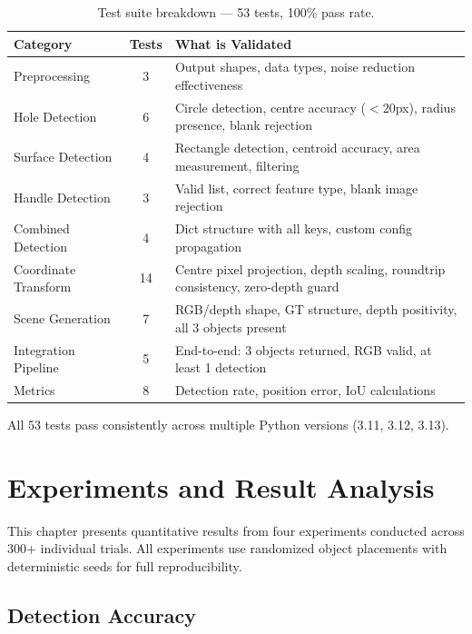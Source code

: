 \documentclass[11pt,a4paper]{article}
\begin{document}
\begin{table}[H]
\centering
\caption{Test suite breakdown --- 53 tests, 100\% pass rate.}
\label{tab:tests}
\small
\begin{tabularx}{\textwidth}{l c X}
\toprule
\textbf{Category} & \textbf{Tests} & \textbf{What is Validated} \\
\midrule
Preprocessing & 3 & Output shapes, data types, noise reduction effectiveness \\
Hole Detection & 6 & Circle detection, centre accuracy ($<$20px), radius presence, blank rejection \\
Surface Detection & 4 & Rectangle detection, centroid accuracy, area measurement, filtering \\
Handle Detection & 3 & Valid list, correct feature type, blank image rejection \\
Combined Detection & 4 & Dict structure with all keys, custom config propagation \\
Coordinate Transform & 14 & Centre pixel projection, depth scaling, roundtrip consistency, zero-depth guard \\
Scene Generation & 7 & RGB/depth shape, GT structure, depth positivity, all 3 objects present \\
Integration Pipeline & 5 & End-to-end: 3 objects returned, RGB valid, at least 1 detection \\
Metrics & 8 & Detection rate, position error, IoU calculations \\
\bottomrule
\end{tabularx}
\end{table}

All 53 tests pass consistently across multiple Python versions (3.11, 3.12, 3.13).

\section{Experiments and Result Analysis}

This chapter presents quantitative results from four experiments conducted across 300+ individual trials. All experiments use randomized object placements with deterministic seeds for full reproducibility.

\subsection{Detection Accuracy}
\end{document}
